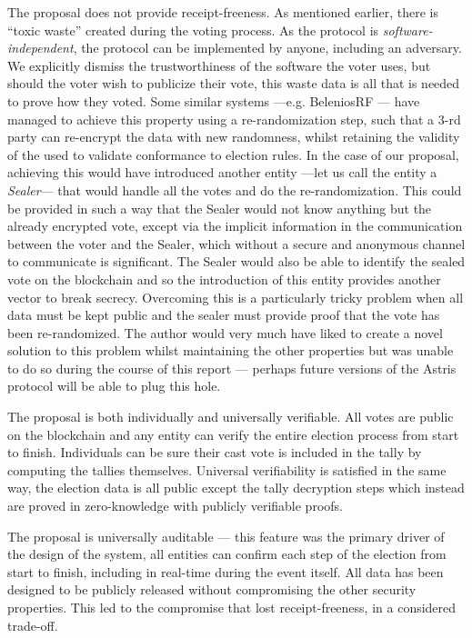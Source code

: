 The proposal does not provide receipt-freeness. As mentioned earlier, there is ``toxic waste'' created during the voting process. As the protocol is \emph{software-independent}, the protocol can be implemented by anyone, including an adversary. We explicitly dismiss the trustworthiness of the software the voter uses, but should the voter wish to publicize their vote, this waste data is all that is needed to prove how they voted. Some similar systems ---e.g. BeleniosRF \cite{cortierBeleniosSimplePrivate2019}--- have managed to achieve this property using a re-randomization step, such that a 3-rd party can re-encrypt the data with new randomness, whilst retaining the validity of the  used to validate conformance to election rules. In the case of our proposal, achieving this would have introduced another entity ---let us call the entity a \emph{Sealer}--- that would handle all the votes and do the re-randomization. This could be provided in such a way that the Sealer would not know anything but the already encrypted vote, except via the implicit information in the communication between the voter and the Sealer, which without a secure and anonymous channel to communicate is significant. The Sealer would also be able to identify the sealed vote on the blockchain and so the introduction of this entity provides another vector to break secrecy. Overcoming this is a particularly tricky problem when all data must be kept public and the sealer must provide proof that the vote has been re-randomized. The author would very much have liked to create a novel solution to this problem whilst maintaining the other properties but was unable to do so during the course of this report --- perhaps future versions of the Astris protocol will be able to plug this hole.

The proposal is both individually and universally verifiable. All votes are public on the blockchain and any entity can verify the entire election process from start to finish. Individuals can be sure their cast vote is included in the tally by computing the tallies themselves. Universal verifiability is satisfied in the same way, the election data is all public except the tally decryption steps which instead are proved in zero-knowledge with publicly verifiable proofs.

The proposal is universally auditable --- this feature was the primary driver of the design of the system, all entities can confirm each step of the election from start to finish, including in real-time during the event itself. All data has been designed to be publicly released without compromising the other security properties. This led to the compromise that lost receipt-freeness, in a considered trade-off.

